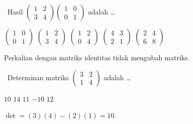 \documentclass[11pt,a4paper]{exam}
\newcommand{\Inter}{{\footnotesize\textsf{\textcolor{biru}{[Intermediate]}}}\ }
\begin{document}
\begin{questions}
\question \Inter Hasil $\begin{pmatrix} 1 & 2\\ 3 & 4 \end{pmatrix}
\begin{pmatrix} 1 & 0\\ 0 & 1 \end{pmatrix}$ adalah \dots
\begin{choices}
\choice $\begin{pmatrix} 1 & 0\\ 0 & 1 \end{pmatrix}$
\CorrectChoice $\begin{pmatrix} 1 & 2\\ 3 & 4 \end{pmatrix}$
\choice $\begin{pmatrix} 1 & 2\\ 0 & 4 \end{pmatrix}$
\choice $\begin{pmatrix} 4 & 3\\ 2 & 1 \end{pmatrix}$
\choice $\begin{pmatrix} 2 & 4\\ 6 & 8 \end{pmatrix}$
\end{choices}
\begin{solution}Perkalian dengan matriks identitas tidak mengubah matriks.\end{solution}

\question \Inter Determinan matriks $\begin{pmatrix} 3 & 2\\ 1 & 4 \end{pmatrix}$ adalah \dots
\begin{choices}
\CorrectChoice $10$ \choice $14$ \choice $11$ \choice $-10$ \choice $12$
\end{choices}
\begin{solution}$\det = (3)(4)-(2)(1) = 10.$\end{solution}


\end{questions}
\end{document}
